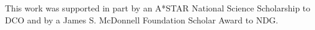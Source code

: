 \documentclass[10pt,letterpaper]{article}
\begin{document}
This work was supported in part by an A*STAR National Science Scholarship to DCO and by a James S. McDonnell Foundation Scholar Award to NDG.




\setlength{\bibleftmargin}{.125in}
\setlength{\bibindent}{-\bibleftmargin}





%
%
%
%
\end{document}
